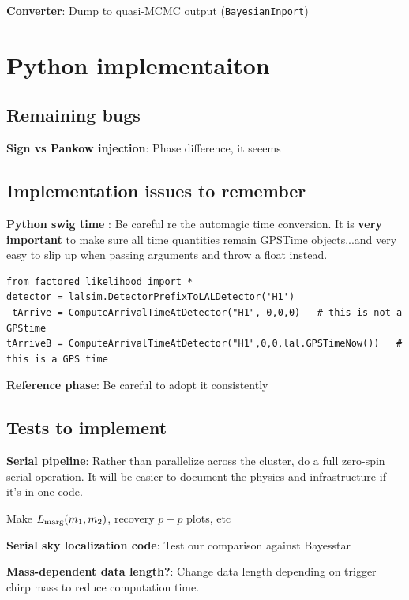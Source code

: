 \documentclass[twocolumn,prd,nofootinbib]{revtex4}
\begin{document}
\noindent \textbf{Converter}: Dump to quasi-MCMC output (\texttt{BayesianInport})

\section{Python implementaiton}



\subsection{Remaining bugs}
\noindent \textbf{Sign vs Pankow injection}: Phase difference, it seeems



\subsection{Implementation issues to remember}



\noindent \textbf{Python swig time }: Be careful re the automagic time conversion. It is \textbf{very important} to make
sure all time quantities remain GPSTime objects...and very easy to slip up when passing arguments and throw a float
instead.  
\begin{shaded}
\begin{verbatim}
from factored_likelihood import *
detector = lalsim.DetectorPrefixToLALDetector('H1')
 tArrive = ComputeArrivalTimeAtDetector("H1", 0,0,0)   # this is not a GPStime
tArriveB = ComputeArrivalTimeAtDetector("H1",0,0,lal.GPSTimeNow())   # this is a GPS time
\end{verbatim}
\end{shaded}

\noindent \textbf{Reference phase}: Be careful to adopt it consistently

\subsection{Tests to implement}
\noindent \textbf{Serial pipeline}: Rather than parallelize across the cluster, do a full zero-spin serial operation.
It will be easier to document the physics and infrastructure if it's in one code.

Make $L_{\rm marg}(m_1,m_2)$, recovery $p-p$ plots, etc

\noindent \textbf{Serial sky localization code}: Test our comparison against Bayesstar

\noindent \textbf{Mass-dependent data length?}: Change data length depending on trigger chirp mass to reduce computation time.
\end{document}
